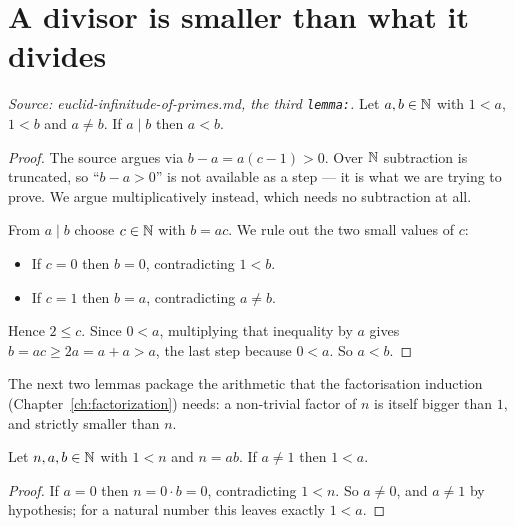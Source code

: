 \section{A divisor is smaller than what it divides}

\begin{lemma}
  \leanok
  \label{lem:dvd_lt_of_ne}
  \textit{Source: euclid-infinitude-of-primes.md, the third \texttt{lemma:}.}
  Let $a, b \in \mathbb{N}$ with $1 < a$, $1 < b$ and $a \neq b$. If $a \mid b$ then
  $a < b$.
\end{lemma}
\begin{proof}

\leanok
  The source argues via $b - a = a(c-1) > 0$. Over $\mathbb{N}$ subtraction is
  truncated, so ``$b - a > 0$'' is not available as a step --- it is what we are
  trying to prove. We argue multiplicatively instead, which needs no subtraction
  at all.

  From $a \mid b$ choose $c \in \mathbb{N}$ with $b = a c$. We rule out the two small
  values of $c$:
  \begin{itemize}
    \item If $c = 0$ then $b = 0$, contradicting $1 < b$.
    \item If $c = 1$ then $b = a$, contradicting $a \neq b$.
  \end{itemize}
  Hence $2 \le c$. Since $0 < a$, multiplying that inequality by $a$ gives
  $b = a c \ge 2a = a + a > a$, the last step because $0 < a$. So $a < b$.
\end{proof}

The next two lemmas package the arithmetic that the factorisation induction
(Chapter~\ref{ch:factorization}) needs: a non-trivial factor of $n$ is itself
bigger than $1$, and strictly smaller than $n$.

\begin{lemma}
  \leanok
  \label{lem:one_lt_factor}
  Let $n, a, b \in \mathbb{N}$ with $1 < n$ and $n = a b$. If $a \neq 1$ then $1 < a$.
\end{lemma}
\begin{proof}

\leanok
  If $a = 0$ then $n = 0 \cdot b = 0$, contradicting $1 < n$. So $a \neq 0$, and
  $a \neq 1$ by hypothesis; for a natural number this leaves exactly $1 < a$.
\end{proof}

